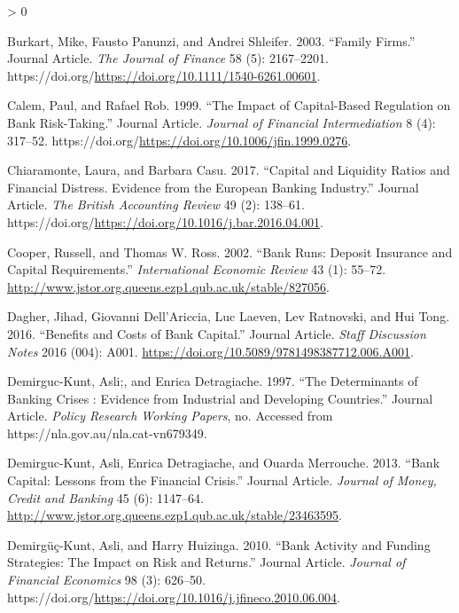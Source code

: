\documentclass{article}
\newlength{\cslhangindent}
\newenvironment{CSLReferences}[2] %
 {%
  \setlength{\parindent}{0pt}
  \ifodd #1 \everypar{\setlength{\hangindent}{\cslhangindent}}\ignorespaces\fi
  \ifnum #2 > 0
  \setlength{\parskip}{#2\baselineskip}
  \fi
 }%
 {}
\begin{document}
\begin{CSLReferences}{1}{0}
\leavevmode\hypertarget{ref-RN33}{}%
Burkart, Mike, Fausto Panunzi, and Andrei Shleifer. 2003. {``Family
Firms.''} Journal Article. \emph{The Journal of Finance} 58 (5):
2167--2201.
https://doi.org/\url{https://doi.org/10.1111/1540-6261.00601}.

\leavevmode\hypertarget{ref-RN35}{}%
Calem, Paul, and Rafael Rob. 1999. {``The Impact of Capital-Based
Regulation on Bank Risk-Taking.''} Journal Article. \emph{Journal of
Financial Intermediation} 8 (4): 317--52.
https://doi.org/\url{https://doi.org/10.1006/jfin.1999.0276}.

\leavevmode\hypertarget{ref-RN36}{}%
Chiaramonte, Laura, and Barbara Casu. 2017. {``Capital and Liquidity
Ratios and Financial Distress. Evidence from the European Banking
Industry.''} Journal Article. \emph{The British Accounting Review} 49
(2): 138--61.
https://doi.org/\url{https://doi.org/10.1016/j.bar.2016.04.001}.

\leavevmode\hypertarget{ref-RN37}{}%
Cooper, Russell, and Thomas W. Ross. 2002. {``Bank Runs: Deposit
Insurance and Capital Requirements.''} \emph{International Economic
Review} 43 (1): 55--72.
\url{http://www.jstor.org.queens.ezp1.qub.ac.uk/stable/827056}.

\leavevmode\hypertarget{ref-RN40}{}%
Dagher, Jihad, Giovanni Dell'Ariccia, Luc Laeven, Lev Ratnovski, and Hui
Tong. 2016. {``Benefits and Costs of Bank Capital.''} Journal Article.
\emph{Staff Discussion Notes} 2016 (004): A001.
\url{https://doi.org/10.5089/9781498387712.006.A001}.

\leavevmode\hypertarget{ref-RN41}{}%
Demirguc-Kunt, Asli;, and Enrica Detragiache. 1997. {``The Determinants
of Banking Crises : Evidence from Industrial and Developing
Countries.''} Journal Article. \emph{Policy Research Working Papers},
no. Accessed from https://nla.gov.au/nla.cat-vn679349.

\leavevmode\hypertarget{ref-RN42}{}%
Demirguc-Kunt, Asli, Enrica Detragiache, and Ouarda Merrouche. 2013.
{``Bank Capital: Lessons from the Financial Crisis.''} Journal Article.
\emph{Journal of Money, Credit and Banking} 45 (6): 1147--64.
\url{http://www.jstor.org.queens.ezp1.qub.ac.uk/stable/23463595}.

\leavevmode\hypertarget{ref-RN43}{}%
Demirgüç-Kunt, Asli, and Harry Huizinga. 2010. {``Bank Activity and
Funding Strategies: The Impact on Risk and Returns.''} Journal Article.
\emph{Journal of Financial Economics} 98 (3): 626--50.
https://doi.org/\url{https://doi.org/10.1016/j.jfineco.2010.06.004}.


\end{CSLReferences}
\end{document}
